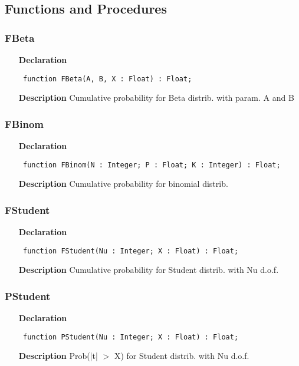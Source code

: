\documentclass[12pt,a4paper,oneside]{report}
\newcommand{\declarationitem}[1]{\textbf{#1}}
\newcommand{\descriptiontitle}[1]{\textbf{#1}}
\newcommand{\code}[1]{\texttt{#1}}
\begin{document}
\subsection{Functions and Procedures}
\subsubsection{FBeta}
\label{uibtdist-FBeta}
\begin{itemize}\item[\declarationitem{Declaration}\hfill]
	\begin{flushleft}
		\code{
			function FBeta(A, B, X : Float) : Float;}
	\end{flushleft}
	\item[\descriptiontitle{Description}]
	Cumulative probability for Beta distrib. with param. A and B
\end{itemize}
\subsubsection{FBinom}
\label{uibtdist-FBinom}
\begin{itemize}\item[\declarationitem{Declaration}\hfill]
	\begin{flushleft}
		\code{
			function FBinom(N : Integer; P : Float; K : Integer) : Float;}
	\end{flushleft}
	\item[\descriptiontitle{Description}]
	Cumulative probability for binomial distrib.
\end{itemize}
\subsubsection{FStudent}
\label{uibtdist-FStudent}
\begin{itemize}\item[\declarationitem{Declaration}\hfill]
	\begin{flushleft}
		\code{
			function FStudent(Nu : Integer; X : Float) : Float;}
	\end{flushleft}
	\item[\descriptiontitle{Description}]
	Cumulative probability for Student distrib. with Nu d.o.f.
\end{itemize}
\subsubsection{PStudent}
\label{uibtdist-PStudent}
\begin{itemize}\item[\declarationitem{Declaration}\hfill]
	\begin{flushleft}
		\code{
			function PStudent(Nu : Integer; X : Float) : Float;}
	\end{flushleft}
	\item[\descriptiontitle{Description}]
	Prob(|t| {$>$} X) for Student distrib. with Nu d.o.f.
\end{itemize}
\end{document}
